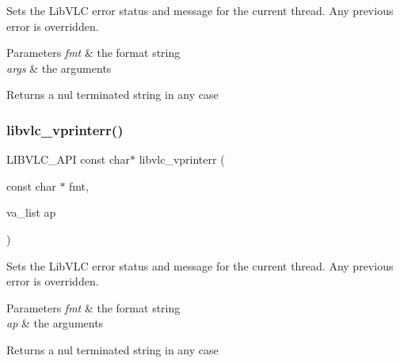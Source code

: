 Sets the Lib\+V\+LC error status and message for the current thread. Any previous error is overridden. 
\begin{DoxyParams}{Parameters}
{\em fmt} & the format string \\
\hline
{\em args} & the arguments \\
\hline
\end{DoxyParams}
\begin{DoxyReturn}{Returns}
a nul terminated string in any case 
\end{DoxyReturn}
\mbox{\label{group__libvlc__error_ga9ad774cb360961ad4ebf4f4b4c548157}} 
\subsubsection{\texorpdfstring{libvlc\+\_\+vprinterr()}{libvlc\_vprinterr()}}
{\footnotesize\ttfamily L\+I\+B\+V\+L\+C\+\_\+\+A\+PI const char$\ast$ libvlc\+\_\+vprinterr (\begin{DoxyParamCaption}\item[{const char $\ast$}]{fmt,  }\item[{va\+\_\+list}]{ap }\end{DoxyParamCaption})}

Sets the Lib\+V\+LC error status and message for the current thread. Any previous error is overridden. 
\begin{DoxyParams}{Parameters}
{\em fmt} & the format string \\
\hline
{\em ap} & the arguments \\
\hline
\end{DoxyParams}
\begin{DoxyReturn}{Returns}
a nul terminated string in any case 
\end{DoxyReturn}

